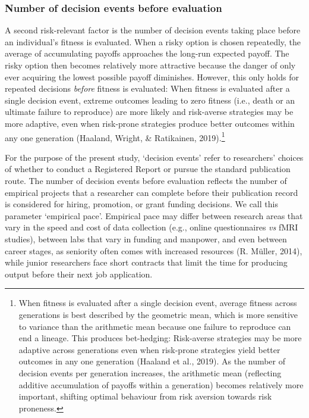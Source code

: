 \documentclass[
  british,
  a4paper,
  ,man,floatsintext]{apa6}
\begin{document}
\subsubsection{Number of decision events before evaluation}\label{number-of-decision-events-before-evaluation}

A second risk-relevant factor is the number of decision events taking place before an individual's fitness is evaluated.
When a risky option is chosen repeatedly, the average of accumulating payoffs approaches the long-run expected payoff.
The risky option then becomes relatively more attractive because the danger of only ever acquiring the lowest possible payoff diminishes.
However, this only holds for repeated decisions \emph{before} fitness is evaluated:
When fitness is evaluated after a single decision event, extreme outcomes leading to zero fitness (i.e., death or an ultimate failure to reproduce) are more likely and risk-averse strategies may be more adaptive, even when risk-prone strategies produce better outcomes within any one generation (Haaland, Wright, \& Ratikainen, 2019).\footnote{When fitness is evaluated after a single decision event, average fitness across generations is best described by the geometric mean, which is more sensitive to variance than the arithmetic mean because one failure to reproduce can end a lineage. This produces bet-hedging: Risk-averse strategies may be more adaptive across generations even when risk-prone strategies yield better outcomes in any one generation (Haaland et al., 2019). As the number of decision events per generation increases, the arithmetic mean (reflecting additive accumulation of payoffs within a generation) becomes relatively more important, shifting optimal behaviour from risk aversion towards risk proneness.}

For the purpose of the present study, `decision events' refer to researchers' choices of whether to conduct a Registered Report or pursue the standard publication route.
The number of decision events before evaluation reflects the number of empirical projects that a researcher can complete before their publication record is considered for hiring, promotion, or grant funding decisions.
We call this parameter `empirical pace'.
Empirical pace may differ between research areas that vary in the speed and cost of data collection (e.g., online questionnaires \emph{vs} fMRI studies), between labs that vary in funding and manpower, and even between career stages, as seniority often comes with increased resources (R. Müller, 2014), while junior researchers face short contracts that limit the time for producing output before their next job application.
\end{document}
